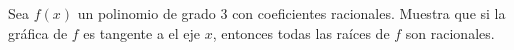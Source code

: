 Sea $f(x)$ un polinomio de grado $3$ con coeficientes racionales. Muestra que si la gráfica de $f$ es tangente a el eje $x$, entonces todas las raíces de $f$ son racionales.